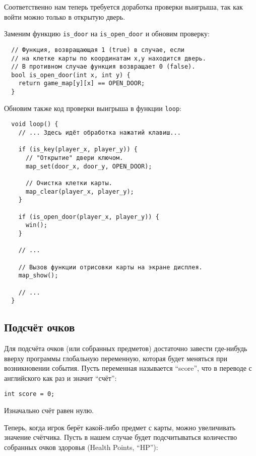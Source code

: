 \documentclass[../sparc.tex]{subfiles}
\begin{document}
Соответственно нам теперь требуется доработка проверки выигрыша, так как войти
можно только в открытую дверь.

Заменим функцию \texttt{is\_door} на \texttt{is\_open\_door} и обновим проверку:

\begin{verbatim}
  // Функция, возвращающая 1 (true) в случае, если
  // на клетке карты по координатам x,y находится дверь.
  // В противном случае функция возвращает 0 (false).
  bool is_open_door(int x, int y) {
    return game_map[y][x] == OPEN_DOOR;
  }
\end{verbatim}

Обновим также код проверки выигрыша в функции \texttt{loop}:

\begin{verbatim}
  void loop() {
    // ... Здесь идёт обработка нажатий клавиш...

    if (is_key(player_x, player_y)) {
      // "Открытие" двери ключом.
      map_set(door_x, door_y, OPEN_DOOR);

      // Очистка клетки карты.
      map_clear(player_x, player_y);
    }

    if (is_open_door(player_x, player_y)) {
      win();
    }

    // ...

    // Вызов функции отрисовки карты на экране дисплея.
    map_show();

    // ...
  }
\end{verbatim}

\subsection{Подсчёт очков}

Для подсчёта очков (или собранных предметов) достаточно завести где-нибудь
вверху программы глобальную переменную, которая будет меняться при возникновении
события.  Пусть переменная называется ``score'', что в переводе с английского
как раз и значит ``счёт'':

\begin{verbatim}
int score = 0;
\end{verbatim}

Изначально счёт равен нулю.

Теперь, когда игрок берёт какой-либо предмет с карты, можно увеличивать значение
счётчика.  Пусть в нашем случае будет подсчитываться количество собранных очков
здоровья (Health Points, ``HP''):
\end{document}
